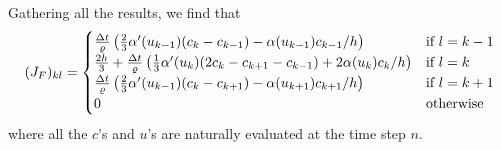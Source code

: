 \documentclass[12pt]{article}
\begin{document}
Gathering all the results, we find that 
\begin{align}
 (J_F)_{kl} = \begin{cases} {\Delta t \over \varrho}\left(\frac{2}{3}\alpha'(u_{k-1})(c_k - c_{k-1})  -\alpha(u_{k-1})c_{k-1}/h\right) & \text{if } l = k-1 \\ {2h \over 3} + {\Delta t \over \varrho}\left(\frac{1}{3}\alpha'(u_{k})(2c_k - c_{k+1}- c_{k-1}) + 2\alpha(u_{k})c_{k}/h\right) & \text{if } l = k \\ {\Delta t \over \varrho}\left(\frac{2}{3}\alpha'(u_{k-1})(c_k - c_{k+1}) -\alpha(u_{k+1})c_{k+1}/h\right) & \text{if } l = k+1 \\ 0 & \text{otherwise}  \end{cases}
\end{align}
where all the $c$'s and $u$'s are naturally evaluated at the time step $n$.
\end{document}
